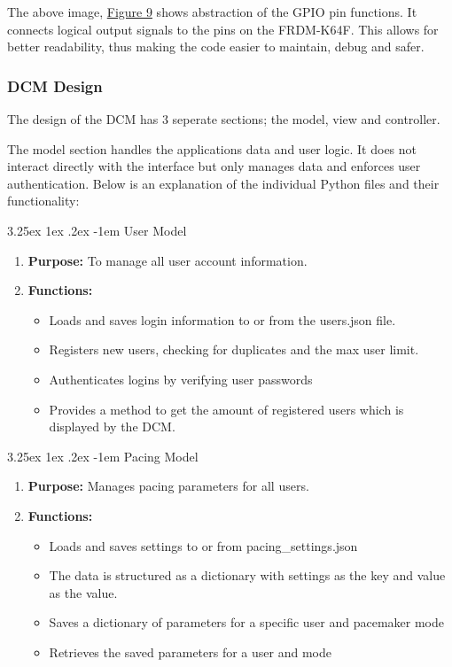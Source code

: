 \documentclass{article}
\makeatletter
\newcounter{subsubsubsection}[subsubsection]
\renewcommand\paragraph{\@startsection{paragraph}{5}{\z@}%
  {3.25ex \@plus1ex \@minus.2ex}%
  {-1em}%
  {\normalfont\normalsize\bfseries}}
\makeatother
\begin{document}
The above image, \hyperref[HardHide]{Figure 9} shows abstraction of the GPIO pin functions. 
It connects logical output signals to the pins on the FRDM-K64F. This allows for better readability,
thus making the code easier to maintain, debug and safer. 

\newpage
\subsubsection{DCM Design}

The design of the DCM has 3 seperate sections; the model, view and controller. 

The model section handles the applications data and user logic. It does not interact directly with the interface but 
only manages data and enforces user authentication. Below is an explanation of the individual Python files and their 
functionality:

\paragraph{User Model}
\begin{enumerate}[label=]
    \item \textbf{Purpose:} To manage all user account information.
    \item \textbf{Functions:}
    \begin{itemize}
        \item Loads and saves login information to or from the users.json file.
        \item Registers new users, checking for duplicates and the max user limit.
        \item Authenticates logins by verifying user passwords
        \item Provides a method to get the amount of registered users which is displayed by the DCM.
    \end{itemize}
\end{enumerate}

\paragraph{Pacing Model}
\begin{enumerate}[label=]
    \item \textbf{Purpose:} Manages pacing parameters for all users.
    \item \textbf{Functions:}
    \begin{itemize}
        \item Loads and saves settings to or from pacing\_settings.json
        \item The data is structured as a dictionary with settings as the key and value as the value.
        \item Saves a dictionary of parameters for a specific user and pacemaker mode
        \item Retrieves the saved parameters for a user and mode
    \end{itemize}
\end{enumerate}
\end{document}
